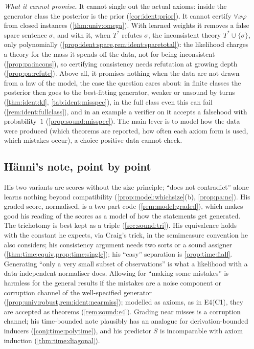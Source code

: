 \emph{What it cannot promise.} It cannot single out the actual axioms: inside the generator class the posterior is the prior (\cref{cor:ident:prior}). It cannot certify $\forall x\varphi$ from closed instances (\cref{thm:univ:omega}). With learned weights it removes a false spare sentence $\sigma$, and with it, when $T^*$ refutes $\sigma$, the inconsistent theory $T^*\cup\{\sigma\}$, only polynomially (\cref{prop:ident:spare,rem:ident:sparetotal}): the likelihood charges a theory for the mass it spends off the data, not for being inconsistent (\cref{prop:pa:incons}), so certifying consistency needs refutation at growing depth (\cref{prop:pa:refute}). Above all, it promises nothing when the data are not drawn from a law of the model, the case the question cares about: in finite classes the posterior then goes to the best-fitting generator, weaker or unsound by turns (\cref{thm:ident:kl}, \cref{tab:ident:misspec}), in the full class even this can fail (\cref{rem:ident:fullclass}), and in an example a verifier on it accepts a falsehood with probability~$1$ (\cref{prop:sound:misspec}). The main lever is to model how the data were produced (which theorems are reported, how often each axiom form is used, which mistakes occur), a choice positive data cannot check.

\subsection{H\"anni's note, point by point}\label{sec:disc:hanni}

His two variants are scores without the size principle; ``does not contradict'' alone learns nothing beyond compatibility (\cref{prop:model:whichsize}(b), \cref{prop:pa:nc}). His graded score, normalised, is a two-part code (\cref{rem:model:graded}), which makes good his reading of the scores as a model of how the statements get generated. The trichotomy is best kept as a triple (\cref{sec:sound:tri}). His equivalence holds with the constant he expects, via Craig's trick, in the semimeasure convention he also considers; his consistency argument needs two sorts or a sound assigner (\cref{thm:time:equiv,prop:time:single}); his ``easy'' separation is \cref{prop:time:fiall}. Generating ``only a very small subset of observations'' is what a likelihood with a data-independent normaliser does. Allowing for ``making some mistakes'' is harmless for the general results if the mistakes are a noise component or corruption channel of the well-specified generator (\cref{prop:univ:robust,rem:ident:nearmiss}); modelled as axioms, as in E4(C1), they are accepted as theorems (\cref{rem:sound:e4}). Grading near misses is a corruption channel; his time-bounded note plausibly has an analogue for derivation-bounded inducers (\cref{conj:time:polytime}), and his predictor $S$ is incomparable with axiom induction (\cref{thm:time:diagonal}).

